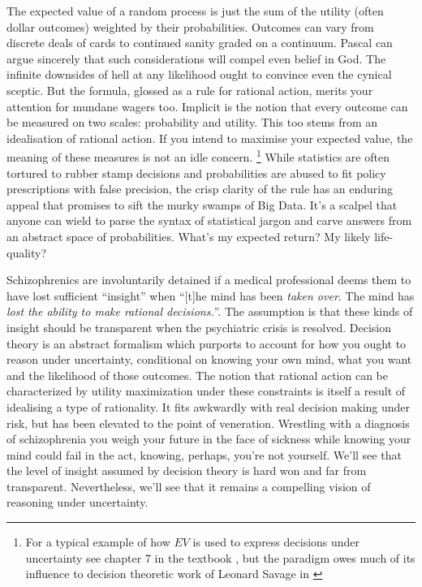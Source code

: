 \documentclass[]{tufte-book}
\theoremstyle{definition}
\theoremstyle{definition}
\theoremstyle{definition}
\theoremstyle{remark}
\begin{document}
The expected value of a random process is just the sum of the utility (often dollar outcomes) weighted by their probabilities. Outcomes can vary from discrete deals of cards to continued sanity graded on a continuum. Pascal can argue sincerely that such considerations will compel even belief in God. The infinite downsides of hell at any likelihood ought to convince even the cynical sceptic. But the formula, glossed as a rule for rational action, merits your attention for mundane wagers too. Implicit is the notion that every outcome can be measured on two scales: probability and utility. This too stems from an idealisation of rational action. If you intend to maximise your expected value, the meaning of these measures is not an idle concern. \footnote{For a typical example of how \(EV\) is used to express decisions under uncertainty see chapter 7 in the textbook \citep{BarberBR_ML}, but the paradigm owes much of its influence to decision theoretic work of Leonard Savage in \citep{savage54}} While statistics are often tortured to rubber stamp decisions and probabilities are abused to fit policy prescriptions with false precision, the crisp clarity of the rule has an enduring appeal that promises to sift the murky swamps of Big Data. It's a scalpel that anyone can wield to parse the syntax of statistical jargon and carve answers from an abstract space of probabilities. What's my expected return? My likely life-quality?

Schizophrenics are involuntarily detained if a medical professional deems them to have lost sufficient ``insight'' when ``{[}t{]}he mind has been \emph{taken over}. The mind has \emph{lost the ability to make rational decisions.}''\citep{WangSchizophrenia}. The assumption is that these kinds of insight should be transparent when the psychiatric crisis is resolved. Decision theory is an abstract formalism which purports to account for how you ought to reason under uncertainty, conditional on knowing your own mind, what you want and the likelihood of those outcomes. The notion that rational action can be characterized by utility maximization under these constraints is itself a result of idealising a type of rationality. It fits awkwardly with real decision making under risk, but has been elevated to the point of veneration. Wrestling with a diagnosis of schizophrenia you weigh your future in the face of sickness while knowing your mind could fail in the act, knowing, perhaps, you're not yourself. We'll see that the level of insight assumed by decision theory is hard won and far from transparent. Nevertheless, we'll see that it remains a compelling vision of reasoning under uncertainty.
\end{document}
